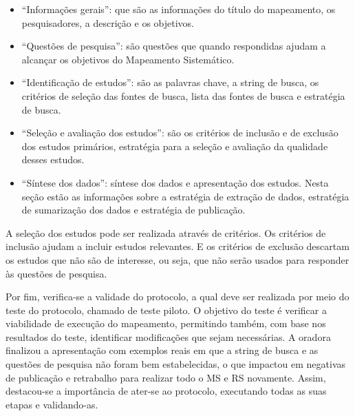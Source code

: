 \begin{itemize}
  \item ``Informações gerais'': que são as informações do título do mapeamento, os pesquisadores, a descrição e os objetivos.
  \item ``Questões de pesquisa'': são questões que quando respondidas ajudam a alcançar os objetivos do Mapeamento Sistemático.
  \item ``Identificação de estudos'': são as palavras chave, a string de busca, os critérios de seleção das fontes de busca, lista das fontes de busca e estratégia de busca.
  \item ``Seleção e avaliação dos estudos'': são os critérios de inclusão e de exclusão dos estudos primários, estratégia para a seleção e avaliação da qualidade desses estudos.
  \item ``Síntese dos dados'': síntese dos dados e apresentação dos estudos. Nesta seção estão as informações sobre a estratégia de extração de dados, estratégia de sumarização dos dados e estratégia de publicação.
\end{itemize}

A seleção dos estudos pode ser realizada através de critérios. Os critérios de inclusão ajudam a incluir estudos relevantes. E os critérios de exclusão descartam os estudos que não são de interesse, ou seja, que não serão usados para responder às questões de pesquisa.

Por fim, verifica-se a validade do protocolo, a qual deve ser realizada por meio do teste do protocolo, chamado de teste piloto. O objetivo do teste é verificar a viabilidade de execução do mapeamento, permitindo também, com base nos resultados do teste, identificar modificações que sejam necessárias.
A oradora finalizou a apresentação com exemplos reais em que a string de busca e as questões de pesquisa não foram bem estabelecidas, o que impactou em negativas de publicação e retrabalho para realizar todo o MS e RS novamente. Assim, destacou-se a importância de ater-se ao protocolo, executando todas as suas etapas e validando-as.
